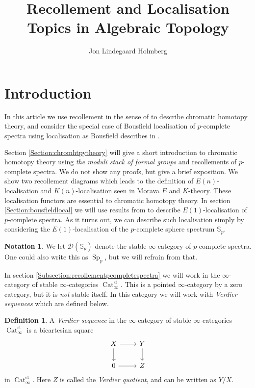 \documentclass[a4paper]{article} %
\author{Jon Lindegaard Holmberg}
\title{Recollement and Localisation\\Topics in Algebraic Topology}
\theoremstyle{definition}
\newtheorem{definition}[theorem]{Definition}
\newtheorem*{notation}{Notation}
\newcommand{\Sph}{\mathbb{S}}
\DeclareMathOperator{\Cat}{Cat}         %
\begin{document}
\maketitle

\tableofcontents

\section{Introduction}
In this article we use recollement in the sense of \cite{barwickglasman} to describe chromatic homotopy theory, and consider the special case of Bousfield localisation of $p$-complete spectra using localisation as Bousfield describes in \cite{bousfield1979localization}.

Section \ref{Section:chromhtpytheory} will give a short introduction to chromatic homotopy theory using \textit{the moduli stack of formal groups} and recollements of $p$-complete spectra. We do not show any proofs, but give a brief exposition. We show two recollement diagrams which leads to the definition of $E(n)$-localisation and $K(n)$-localisation seen in Morava $E$ and $K$-theory. These localisation functors are essential to chromatic homotopy theory. In section \ref{Section:bousfieldlocal} we will use results from \cite{bousfield1979localization}
to describe $E(1)$-localisation of $p$-complete spectra. As it turns out, we can describe such localisation simply by considering the $E(1)$-localisation of the $p$-complete sphere spectrum $\Sph_p$.
\begin{notation}
  We let $\mathcal{D} (\Sph_p)$ denote the stable $\infty$-category of $p$-complete spectra. One could also write this as $\operatorname{Sp}_p$, but we will refrain from that.
\end{notation}
In section \ref{Subsection:recollementpcompletespectra} we will work in the $\infty$-category of stable $\infty$-categories $\Cat^{\text{st}}_\infty$. This is a pointed $\infty$-category by a zero category, but it is \textit{not} stable itself. In this category we will work with \textit{Verdier sequences} which are defined below.

\begin{definition}
  A \textit{Verdier sequence} in the $\infty$-category of stable $\infty$-categories $\Cat^{\text{st}}_\infty$ is a bicartesian square
  \[
    \begin{tikzcd}
      X \arrow{r}{} \arrow{d}{} & Y \arrow{d}{} \\
       0 \arrow{r}{} & Z
    \end{tikzcd}
  \]
  in $\Cat^{\text{st}}_\infty$. Here $Z$ is called the \textit{Verdier quotient}, and can be written as $Y/X$.
\end{definition}
\end{document}
